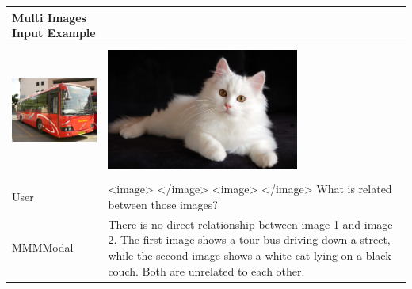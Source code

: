 \documentclass[preprint]{article}
\begin{document}
\begin{table}[hbt!]
  \centering
  \setlength{\extrarowheight}{3pt} %
  \renewcommand{\arraystretch}{1.5} %
  \begin{tabular}{p{6.5cm}p{6.5cm}}
    \hline
    \textbf{Multi Images Input Example}                                                                                                                                                                                                                                                      \\[6pt]
    \hline
    \hline
    \\[-1pt]
    \includegraphics[width=0.9\linewidth,height=4cm]{pic/bus.jpeg} & \includegraphics[width=0.9\linewidth,height=4cm]{pic/cat.jpg}                                                                                                                                                           \\
    \\[-1pt]
    \hline
    User                                                           & <image> </image> <image> </image> What is related between those images?                                                                                                                                                 \\
    MMMModal                                                       & There is no direct relationship between image 1 and image 2. The first image shows a tour bus driving down a street, while the second image shows a white cat lying on a black couch. Both are unrelated to each other. \\
    \hline
  \end{tabular}
\end{table}
\end{document}
